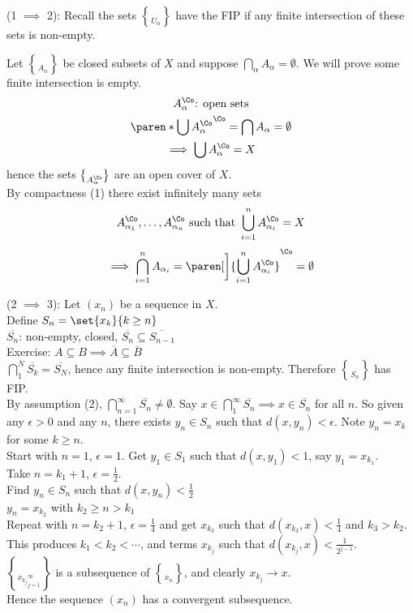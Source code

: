 (1 $\implies$ 2): Recall the sets $\brace{U_\alpha}$ have the FIP if any finite intersection of these sets is non-empty.

Let $\brace{A_\alpha}$ be closed subsets of $X$ and suppose $\bigcap_\alpha A_\alpha=\emptyset$.  We will prove some finite intersection is empty.
\begin{gather*}
A_\alpha^\Co\text{: open sets} \\
\paren*{\bigcup A_\alpha^\Co}^\Co = \bigcap A_\alpha = \emptyset \\
\implies \bigcup A_\alpha^\Co = X
\end{gather*}
hence the sets $\brace{A_\alpha^\Co}$ are an open cover of $X$. \\
By compactness (1) there exist infinitely many sets
\[ A_{\alpha_1}^\Co, \dotsc, A_{\alpha_n}^\Co \text{ such that } \bigcup_{i=1}^n A_{\alpha_i}^\Co = X \]
\[ \implies \bigcap_{i=1}^n A_{\alpha_i} = \paren[\bigg]{\bigcup_{i=1}^n A_{\alpha_i}^\Co}^\Co = \emptyset \]

(2 $\implies$ 3): Let $(x_n)$ be a sequence in $X$. \\
Define $S_n = \set{x_k}{k\geq n}$ \\
$\overline{S_n}$: non-empty, closed, $\overline{S_n}\subseteq\overline{S_{n-1}}$ \\
Exercise: $A \subseteq B \implies \overline{A} \subseteq \overline{B}$ \\
$\bigcap_1^N \overline{S_k} = \overline{S_N}$, hence any finite intersection is non-empty.  Therefore $\brace{S_n}$ has FIP. \\
By assumption (2), $\bigcap_{n=1}^\infty \overline{S_n}\neq\emptyset$.  Say $x\in\bigcap_1^\infty\overline{S_n}\implies x\in\overline{S_n}$ for all $n$.  So given any $\epsilon>0$ and any $n$, there exists $y_n\in S_n$ such that $d(x,y_n)<\epsilon$.  Note $y_n=x_k$ for some $k\geq n$. \\
Start with $n=1$, $\epsilon=1$.  Get $y_1\in S_1$ such that $d(x,y_1)<1$, say $y_1=x_{k_1}$. \\
Take $n=k_1+1$, $\epsilon=\frac12$. \\
Find $y_n\in S_n$ such that $d(x,y_n)<\frac12$ \\
$y_n=x_{k_2}$ with $k_2\geq n > k_1$ \\
Repeat with $n=k_2+1$, $\epsilon=\frac14$ and get $x_{k_3}$ such that $d(x_{k_3},x)<\frac14$ and $k_3>k_2$. \\
This produces $k_1<k_2<\dotsb$, and terms $x_{k_j}$ such that $d(x_{k_j},x)<\frac{1}{2^{j-1}}$. \\
$\brace{x_{k_j}}_{j=1}^\infty$ is a subsequence of $\brace{x_n}$, and clearly $x_{k_j}\to x$. \\
Hence the sequence $(x_n)$ has a convergent subsequence.
